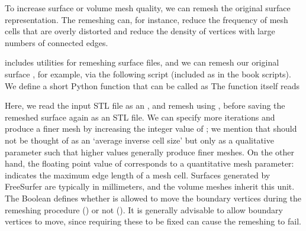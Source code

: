 To increase surface or volume mesh quality, we can remesh the original
surface representation. The remeshing can, for instance, reduce the
frequency of mesh cells that are overly distorted and reduce the
density of vertices with large numbers of connected edges.

\svmtk{} includes utilities for remeshing surface files, and we can
remesh our original surface , for example, via the
following script (included as  in
the book scripts). We define a short Python function
 that can be called as
%
%
\noindent The function itself reads

\noindent Here, we read the input STL file as an \svmtk{}
, and remesh using
, before saving the remeshed
surface again as an STL file. We can specify more iterations and
produce a finer mesh by increasing the integer value of
; we mention that  should not be
thought of as an `average inverse cell size' but only as a qualitative
parameter such that higher values generally produce finer meshes. On
the other hand, the floating point value of 
corresponds to a quantitative mesh parameter: 
indicates the maximum edge length of a mesh cell. Surfaces generated
by FreeSurfer are typically in millimeters, and the volume meshes
inherit this unit. The Boolean
 defines whether \svmtk{}
is allowed to move the boundary vertices during the remeshing
procedure () or not (). It is
generally advisable to allow boundary vertices to move, since
requiring these to be fixed can cause the remeshing to fail.

